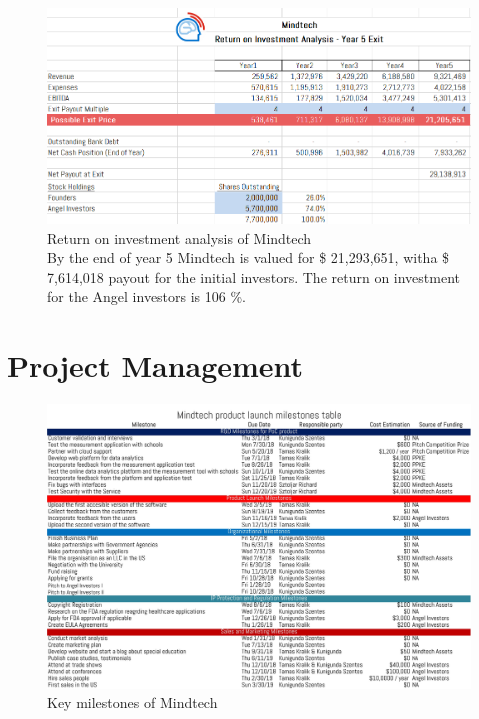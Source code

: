 \documentclass[letterpaper,10pt]{article}
\let\oldsection\section
\renewcommand{\section}{\def\cursectioning{section}\oldsection}
\begin{document}
\begin{appendices}
\begin{figure}[!htb]
\centering
\includegraphics[scale=0.5]{exit.PNG}
\caption[Return on investment analysis of Mindtech]{Return on investment analysis of Mindtech \\ By the end of year 5 Mindtech is valued for \$ 21,293,651, witha \$ 7,614,018 payout for the initial investors. The return on investment for the Angel investors is 106 \%.}
\end{figure}

\newpage


\section{Project Management}
\label{appendix:gantt}


\begin{landscape}
\begin{figure}[!htb]
\centering
\includegraphics[scale=0.4]{milestones.jpg}
\caption{Key milestones of Mindtech}
\end{figure}
\end{landscape}


\end{appendices}
\end{document}
